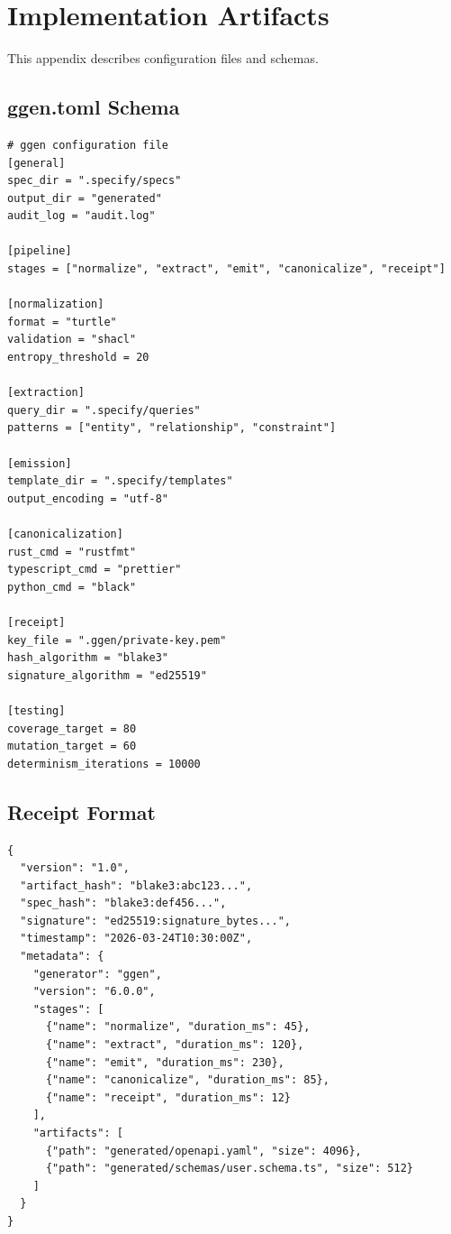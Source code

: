 \chapter{Implementation Artifacts}

This appendix describes configuration files and schemas.

\section{ggen.toml Schema}

\begin{verbatim}
# ggen configuration file
[general]
spec_dir = ".specify/specs"
output_dir = "generated"
audit_log = "audit.log"

[pipeline]
stages = ["normalize", "extract", "emit", "canonicalize", "receipt"]

[normalization]
format = "turtle"
validation = "shacl"
entropy_threshold = 20

[extraction]
query_dir = ".specify/queries"
patterns = ["entity", "relationship", "constraint"]

[emission]
template_dir = ".specify/templates"
output_encoding = "utf-8"

[canonicalization]
rust_cmd = "rustfmt"
typescript_cmd = "prettier"
python_cmd = "black"

[receipt]
key_file = ".ggen/private-key.pem"
hash_algorithm = "blake3"
signature_algorithm = "ed25519"

[testing]
coverage_target = 80
mutation_target = 60
determinism_iterations = 10000
\end{verbatim}

\section{Receipt Format}

\begin{verbatim}
{
  "version": "1.0",
  "artifact_hash": "blake3:abc123...",
  "spec_hash": "blake3:def456...",
  "signature": "ed25519:signature_bytes...",
  "timestamp": "2026-03-24T10:30:00Z",
  "metadata": {
    "generator": "ggen",
    "version": "6.0.0",
    "stages": [
      {"name": "normalize", "duration_ms": 45},
      {"name": "extract", "duration_ms": 120},
      {"name": "emit", "duration_ms": 230},
      {"name": "canonicalize", "duration_ms": 85},
      {"name": "receipt", "duration_ms": 12}
    ],
    "artifacts": [
      {"path": "generated/openapi.yaml", "size": 4096},
      {"path": "generated/schemas/user.schema.ts", "size": 512}
    ]
  }
}
\end{verbatim}

